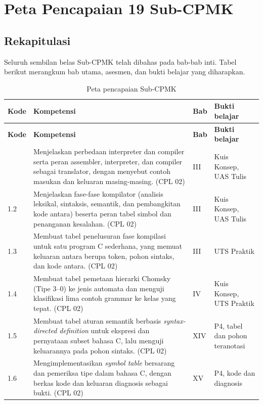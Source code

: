 \section{Peta Pencapaian 19 Sub-CPMK}
\label{sec:ch17-peta}

\subsection{Rekapitulasi}

Seluruh sembilan belas Sub-CPMK telah dibahas pada bab-bab inti.
Tabel berikut merangkum bab utama, asesmen, dan bukti belajar yang
diharapkan.

{\small
\begin{longtable}{@{}p{1.2cm}p{7.0cm}p{1.6cm}p{4.4cm}@{}}
\caption{Peta pencapaian Sub-CPMK}
\label{tab:ch17-peta}\\
\toprule
\textbf{Kode} & \textbf{Kompetensi} & \textbf{Bab} &
\textbf{Bukti belajar} \\
\midrule
\endfirsthead
\toprule
\textbf{Kode} & \textbf{Kompetensi} & \textbf{Bab} &
\textbf{Bukti belajar} \\
\midrule
\endhead
\bottomrule
\endfoot
1.1 & Menjelaskan perbedaan interpreter dan compiler serta peran
assembler, interpreter, dan compiler sebagai translator, dengan
menyebut contoh masukan dan keluaran masing-masing. (CPL 02) &
III & Kuis Konsep, UAS Tulis \\
1.2 & Menjelaskan fase-fase kompilator (analisis leksikal, sintaksis,
semantik, dan pembangkitan kode antara) beserta peran tabel simbol dan
penanganan kesalahan. (CPL 02) & III & Kuis Konsep, UAS Tulis \\
1.3 & Membuat tabel penelusuran fase kompilasi untuk satu program C
sederhana, yang memuat keluaran antara berupa token, pohon sintaks,
dan kode antara. (CPL 02) & III & UTS Praktik \\
1.4 & Membuat tabel pemetaan hierarki Chomsky (Tipe 3--0) ke jenis
automata dan menguji klasifikasi lima contoh grammar ke kelas yang
tepat. (CPL 02) & IV & Kuis Konsep, UTS Praktik \\
1.5 & Membuat tabel aturan semantik berbasis \textit{syntax-directed
definition} untuk ekspresi dan pernyataan subset bahasa C, lalu
menguji keluarannya pada pohon sintaks. (CPL 02) & XIV & P4, tabel
dan pohon teranotasi \\
1.6 & Mengimplementasikan \textit{symbol table} bersarang dan pemeriksa
tipe dalam bahasa C, dengan berkas kode dan keluaran diagnosis sebagai
bukti. (CPL 02) & XV & P4, kode dan diagnosis \\

\end{longtable}}
